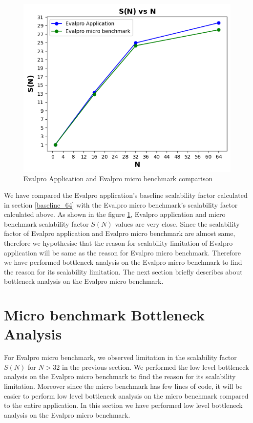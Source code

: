 \documentclass[sigconf]{acmart}
\begin{document}
\begin{figure}[!htb]
  \centering
  \includegraphics[width=\linewidth]{Pictures/scalability_comparision.png}
  \caption{ Evalpro Application and Evalpro micro benchmark comparison}
  \label{evalpro_scalability_comparision}
\end{figure}


We have compared the Evalpro application's  baseline scalability factor calculated in section \ref{baseline_64} with the Evalpro micro benchmark's scalability factor calculated above. As shown in the figure \ref{evalpro_scalability_comparision}, Evalpro application and micro benchmark scalability factor $S(N)$ values are very close. Since  the scalability factor of Evalpro application and Evalpro micro benchmark are almost same, therefore we hypothesise that the reason for scalability limitation of Evalpro application will be same as the reason for Evalpro micro benchmark. Therefore we have performed bottleneck analysis on the Evalpro micro benchmark to find the reason for its scalability limitation. The next section briefly describes about bottleneck analysis on the Evalpro micro benchmark.

\section{Micro benchmark Bottleneck Analysis}\label{micro_benchmark_bottleneck_analysis}

For Evalpro micro benchmark, we observed  limitation in the scalability factor $S(N)$ for $N>32$ in the previous section. We performed the low level bottleneck analysis on the Evalpro micro benchmark to find the reason for its scalability limitation. Moreover since the micro benchmark has few lines of code, it will be easier to perform low level bottleneck analysis on the micro benchmark compared to the entire application. In this section we have performed low level bottleneck analysis on the Evalpro micro benchmark.
\end{document}
